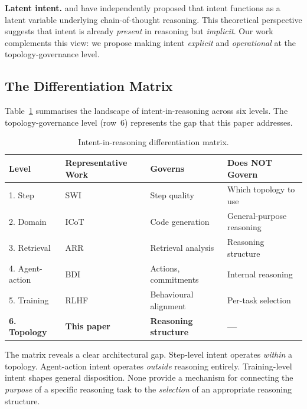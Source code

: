 \documentclass[11pt,a4paper]{article}
\begin{document}
\textbf{Latent intent.} \citet{tutunov2024latent} and \citet{jiang2024latent} have independently proposed that intent functions as a latent variable underlying chain-of-thought reasoning. This theoretical perspective suggests that intent is already \emph{present} in reasoning but \emph{implicit}. Our work complements this view: we propose making intent \emph{explicit} and \emph{operational} at the topology-governance level.

\subsection{The Differentiation Matrix}

Table~\ref{tab:diff} summarises the landscape of intent-in-reasoning across six levels. The topology-governance level (row~6) represents the gap that this paper addresses.

\begin{table}[htbp]
\centering
\caption{Intent-in-reasoning differentiation matrix.}
\label{tab:diff}
\small
\begin{tabularx}{\textwidth}{@{}lllX@{}}
\toprule
\textbf{Level} & \textbf{Representative Work} & \textbf{Governs} & \textbf{Does NOT Govern} \\
\midrule
1. Step & SWI~\citep{yin2025swi} & Step quality & Which topology to use \\
2. Domain & ICoT~\citep{li2025icot} & Code generation & General-purpose reasoning \\
3. Retrieval & ARR~\citep{yin2025arr} & Retrieval analysis & Reasoning structure \\
4. Agent-action & BDI~\citep{cohen1990intention} & Actions, commitments & Internal reasoning \\
5. Training & RLHF~\citep{ouyang2022instructgpt} & Behavioural alignment & Per-task selection \\
\textbf{6. Topology} & \textbf{This paper} & \textbf{Reasoning structure} & \textbf{---} \\
\bottomrule
\end{tabularx}
\end{table}

The matrix reveals a clear architectural gap. Step-level intent operates \emph{within} a topology. Agent-action intent operates \emph{outside} reasoning entirely. Training-level intent shapes general disposition. None provide a mechanism for connecting the \emph{purpose} of a specific reasoning task to the \emph{selection} of an appropriate reasoning structure.
\end{document}
